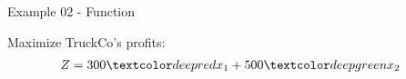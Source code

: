 \begin{frame}{Example 02 - Function}

Maximize TruckCo's profits:
\begin{align*}
    Z &= 300\colora{x_1} + 500\colorb{x_2}
\end{align*}

\end{frame}
